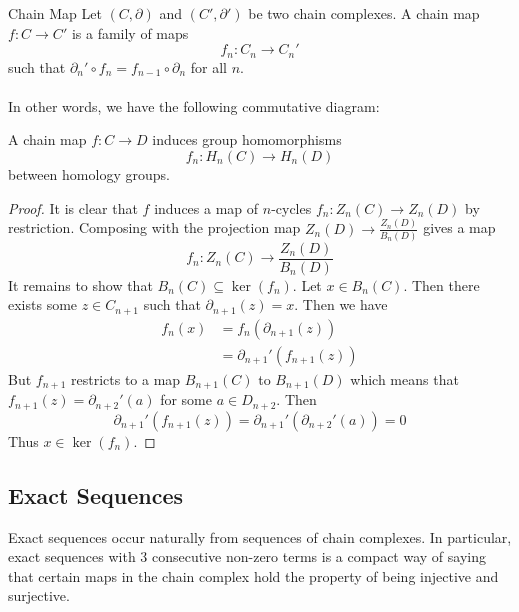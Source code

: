 \documentclass[a4paper]{article}
\begin{document}
\begin{defn}{Chain Map}{} Let $(C,\partial)$ and $(C',\partial')$ be two chain complexes. A chain map $f:C\to C'$ is a family of maps $$f_n:C_n\to C_n'$$ such that $\partial_n'\circ f_n=f_{n-1}\circ\partial_n$ for all $n$. \\~\\
In other words, we have the following commutative diagram: \\
\end{defn}

\begin{lmm}{}{} A chain map $f:C\to D$ induces group homomorphisms $$f_n:H_n(C)\to H_n(D)$$ between homology groups. \tcbline
\begin{proof}
It is clear that $f$ induces a map of $n$-cycles $f_n:Z_n(C)\to Z_n(D)$ by restriction. Composing with the projection map $Z_n(D)\to\frac{Z_n(D)}{B_n(D)}$ gives a map $$f_n:Z_n(C)\to\frac{Z_n(D)}{B_n(D)}$$ It remains to show that $B_n(C)\subseteq\ker(f_n)$. Let $x\in B_n(C)$. Then there exists some $z\in C_{n+1}$ such that $\partial_{n+1}(z)=x$. Then we have 
\begin{align*}
f_n(x)&=f_n(\partial_{n+1}(z))\\
&=\partial_{n+1}'(f_{n+1}(z))
\end{align*}
But $f_{n+1}$ restricts to a map $B_{n+1}(C)$ to $B_{n+1}(D)$ which means that $f_{n+1}(z)=\partial_{n+2}'(a)$ for some $a\in D_{n+2}$. Then $$\partial_{n+1}'(f_{n+1}(z))=\partial_{n+1}'(\partial_{n+2}'(a))=0$$ Thus $x\in\ker(f_n)$. 
\end{proof}
\end{lmm}

\subsection{Exact Sequences}
Exact sequences occur naturally from sequences of chain complexes. In particular, exact sequences with $3$ consecutive non-zero terms is a compact way of saying that certain maps in the chain complex hold the property of being injective and surjective. 
\end{document}

